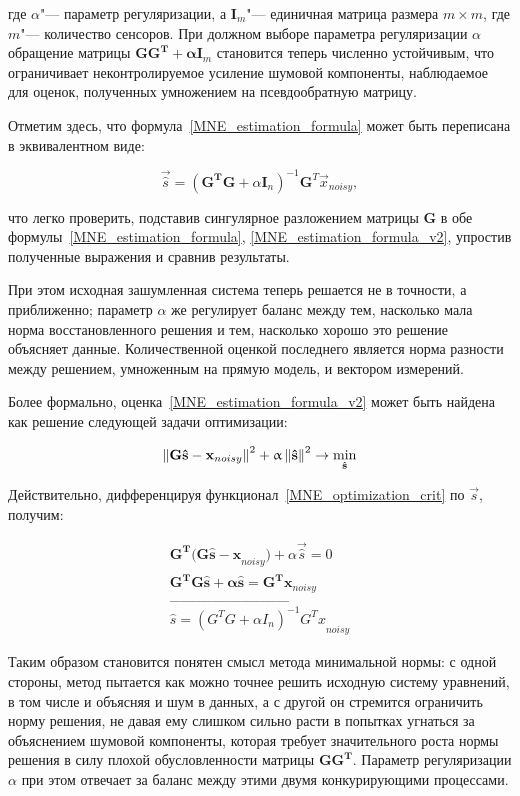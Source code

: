где $\alpha$"--- параметр регуляризации, а $\mathbf{I}_m$"--- единичная матрица
размера $m \times m$, где $m$"--- количество сенсоров. При должном выборе параметра
регуляризации $\alpha$ обращение матрицы $\mathbf{GG^T + \alpha I}_m$
становится теперь численно устойчивым, что ограничивает неконтролируемое
усиление шумовой компоненты, наблюдаемое для оценок, полученных умножением на
псевдообратную матрицу.

Отметим здесь, что формула~\ref{MNE_estimation_formula} может быть переписана в
эквивалентном виде:

\begin{equation}
    \vec{\hat{s}} = (\mathbf{G^TG} + \alpha \mathbf{I}_n)^{-1}\mathbf{G}^T\vec{x}_{noisy},
    \label{MNE_estimation_formula_v2}
\end{equation}

что легко проверить, подставив сингулярное разложением матрицы $\mathbf{G}$ в
обе формулы~\ref{MNE_estimation_formula}, \ref{MNE_estimation_formula_v2},
упростив полученные выражения и сравнив результаты.

При этом исходная зашумленная система теперь решается не в точности, а
приближенно; параметр $\alpha$ же регулирует баланс между
тем, насколько мала норма восстановленного решения и тем, насколько
хорошо это решение объясняет данные. Количественной оценкой последнего
является норма разности между решением, умноженным на прямую модель,
и вектором измерений.

Более формально, оценка~\ref{MNE_estimation_formula_v2} может быть найдена
как решение следующей задачи оптимизации:

\begin{equation}
    \left\lVert\mathbf{G\hat{s} - x}_{noisy}\right\rVert^2 + \upalpha\left\lVert\mathbf{\hat{s}}\right\rVert^2 \rightarrow \underset{\mathbf{\hat{s}}}{\min}
    \label{MNE_optimization_crit}
\end{equation}

Действительно, дифференцируя функционал~\ref{MNE_optimization_crit} по $\vec{s}$,
получим:

\begin{gather*}
    \mathbf{G^T(G\hat{s} - x}_{noisy}) + \alpha\vec{\hat{s}} = 0\\
    \mathbf{G^TG\hat{s} + \alpha \hat{s} = G^Tx}_{noisy}\\
    \vec{\hat{s} = (G^TG + \alpha I_n)^{-1}G^Tx}_{noisy}
\end{gather*}


Таким образом становится понятен смысл метода минимальной нормы: с одной
стороны, метод пытается как можно точнее решить исходную систему уравнений, в
том числе и объясняя и шум в данных, а с другой он стремится ограничить норму
решения, не давая ему слишком сильно расти в попытках угнаться за объяснением
шумовой компоненты, которая требует значительного роста нормы решения в силу
плохой обусловленности матрицы $\mathbf{GG^T}$. Параметр регуляризации $\alpha$
при этом отвечает за баланс между этими двумя конкурирующими процессами.


